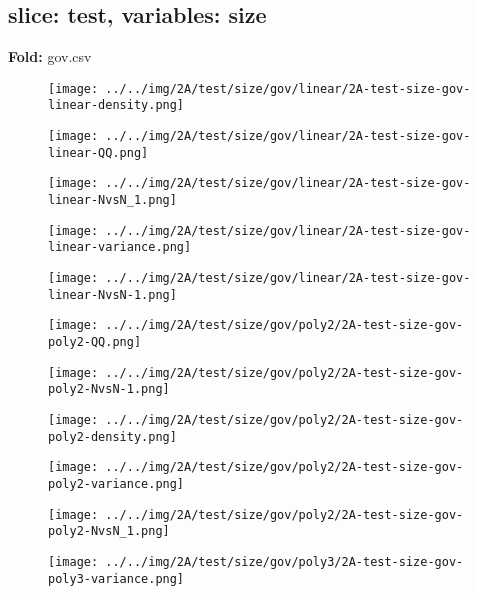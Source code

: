 \subsection{slice: test, variables: size}
\textbf{Fold:} gov.csv
\begin{figure}[H]
\centering	\texttt{[image: ../../img/2A/test/size/gov/linear/2A-test-size-gov-linear-density.png]}
\end{figure}
\begin{figure}[H]
\centering	\texttt{[image: ../../img/2A/test/size/gov/linear/2A-test-size-gov-linear-QQ.png]}
\end{figure}
\begin{figure}[H]
\centering	\texttt{[image: ../../img/2A/test/size/gov/linear/2A-test-size-gov-linear-NvsN\_1.png]}
\end{figure}
\begin{figure}[H]
\centering	\texttt{[image: ../../img/2A/test/size/gov/linear/2A-test-size-gov-linear-variance.png]}
\end{figure}
\begin{figure}[H]
\centering	\texttt{[image: ../../img/2A/test/size/gov/linear/2A-test-size-gov-linear-NvsN-1.png]}
\end{figure}
\begin{figure}[H]
\centering	\texttt{[image: ../../img/2A/test/size/gov/poly2/2A-test-size-gov-poly2-QQ.png]}
\end{figure}
\begin{figure}[H]
\centering	\texttt{[image: ../../img/2A/test/size/gov/poly2/2A-test-size-gov-poly2-NvsN-1.png]}
\end{figure}
\begin{figure}[H]
\centering	\texttt{[image: ../../img/2A/test/size/gov/poly2/2A-test-size-gov-poly2-density.png]}
\end{figure}
\begin{figure}[H]
\centering	\texttt{[image: ../../img/2A/test/size/gov/poly2/2A-test-size-gov-poly2-variance.png]}
\end{figure}
\begin{figure}[H]
\centering	\texttt{[image: ../../img/2A/test/size/gov/poly2/2A-test-size-gov-poly2-NvsN\_1.png]}
\end{figure}
\begin{figure}[H]
\centering	\texttt{[image: ../../img/2A/test/size/gov/poly3/2A-test-size-gov-poly3-variance.png]}
\end{figure}
